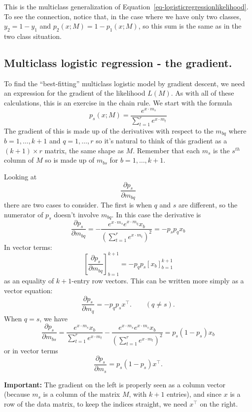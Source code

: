 \documentclass[
  11pt,
  letterpaper,
]{scrbook}
\theoremstyle{plain}
\theoremstyle{remark}
\begin{document}
This is the multiclass generalization of
Equation~\ref{eq-logisticregressionlikelihood}. To see the connection,
notice that, in the case where we have only two classes, \(y_2=1-y_1\)
and \(p_{2}(x;M)=1-p_{1}(x;M)\), so this sum is the same as in the two
class situation.

\hypertarget{multiclass-logistic-regression---the-gradient.}{%
\subsection{Multiclass logistic regression - the
gradient.}\label{multiclass-logistic-regression---the-gradient.}}

To find the ``best-fitting'' multiclass logistic model by gradient
descent, we need an expression for the gradient of the likelihood
\(L(M)\). As with all of these calculations, this is an exercise in the
chain rule. We start with the formula \[
p_{s}(x;M) = \frac{e^{x\cdot m_s}}{\sum_{t=1}^{r} e^{x\cdot m_{t}}}
\] The gradient of this is made up of the derivatives with respect to
the \(m_{bq}\) where \(b=1,\ldots, k+1\) and \(q=1,\dots, r\) so it's
natural to think of this gradient as a \((k+1)\times r\) matrix, the
same shape as \(M\). Remember that each \(m_s\) is the \(s^{th}\) column
of \(M\) so is made up of \(m_{bs}\) for \(b=1,\ldots, k+1\).

Looking at \[
\frac{\partial p_{s}}{\partial m_{bq}}
\] there are two cases to consider. The first is when \(q\) and \(s\)
are different, so the numerator of \(p_{s}\) doesn't involve \(m_{bq}\).
In this case the derivative is \[
\frac{\partial p_{s}}{\partial m_{bq}}=-\frac{e^{x\cdot m_{s}}e^{x\cdot m_{q}}x_b}{(\sum_{t=1}^{r} e^{x\cdot m_{t}})^2}=-p_{s}p_{q}x_{b}
\] In vector terms: \[
[\frac{\partial p_{s}}{\partial m_{bq}}]_{b=1}^{k+1}=-p_{q}p_{s}[x_{b}]_{b=1}^{k+1}
\] as an equality of \(k+1\)-entry row vectors. This can be written more
simply as a vector equation: \[
\frac{\partial p_{s}}{\partial m_{q}}=-p_{q}p_{s}x^{\intercal}.\qquad (q\not=s).
\] When \(q=s\), we have \[
\frac{\partial p_{s}}{\partial m_{bs}}
=\frac{e^{x\cdot m_{s}}x_b}{\sum_{t=1}^{r}e^{x\cdot m_{t}}}-\frac{e^{x\cdot m_{s}}e^{x\cdot m_{s}}x_b}{(\sum_{t=1}^{r} e^{x\cdot m_{t}})^2}=p_{s}(1-p_{s})x_b
\] or in vector terms \[
\frac{\partial p_{s}}{\partial m_{s}}=p_{s}(1-p_{s})x^{\intercal}.
\]

\textbf{Important:} The gradient on the left is properly seen as a
column vector (because \(m_{s}\) is a column of the matrix \(M\), with
\(k+1\) entries), and since \(x\) is a row of the data matrix, to keep
the indices straight, we need \(x^{\intercal}\) on the right.
\end{document}
